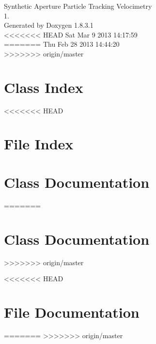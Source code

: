 \documentclass{book}
\begin{document}
\hypersetup{pageanchor=false,citecolor=blue}
\begin{titlepage}
\vspace*{7cm}
\begin{center}
{\Large Synthetic Aperture Particle Tracking Velocimetry \\[1ex]\large 1. }\\
\vspace*{1cm}
{\large Generated by Doxygen 1.8.3.1}\\
\vspace*{0.5cm}
<<<<<<< HEAD
{\small Sat Mar 9 2013 14:17:59}\\
=======
{\small Thu Feb 28 2013 14:44:20}\\
>>>>>>> origin/master
\end{center}
\end{titlepage}
\clearemptydoublepage
{}
\tableofcontents
\clearemptydoublepage
{}
\hypersetup{pageanchor=true,citecolor=blue}
\chapter{Class Index}

<<<<<<< HEAD
\chapter{File Index}

\chapter{Class Documentation}



=======
\chapter{Class Documentation}


>>>>>>> origin/master






<<<<<<< HEAD
\chapter{File Documentation}











=======
>>>>>>> origin/master
\printindex
\end{document}
